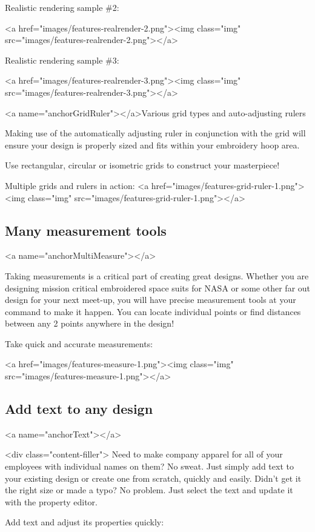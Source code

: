 \documentclass[a4paper, 11pt]{report}
\begin{document}
Realistic rendering sample \#2:

<a href="images/features-realrender-2.png"><img class="img" src="images/features-realrender-2.png"></a>

Realistic rendering sample \#3:

<a href="images/features-realrender-3.png"><img class="img" src="images/features-realrender-3.png"></a>

<a name="anchorGridRuler"></a>Various grid types and auto-adjusting rulers

Making use of the automatically adjusting ruler in conjunction with the grid will ensure your design is properly sized and fits within your embroidery hoop area.

Use rectangular, circular or isometric grids to construct your masterpiece!

Multiple grids and rulers in action:
<a href="images/features-grid-ruler-1.png"><img class="img" src="images/features-grid-ruler-1.png"></a>

\subsection{Many measurement tools}
<a name="anchorMultiMeasure"></a>

Taking measurements is a critical part of creating great designs. Whether you are designing mission critical embroidered space suits for NASA or some other far out design for your next meet-up, you will have precise measurement tools at your command to make it happen. You can locate individual points or find distances between any 2 points anywhere in the design!

Take quick and accurate measurements:

<a href="images/features-measure-1.png"><img class="img" src="images/features-measure-1.png"></a>

\subsection{Add text to any design}
<a name="anchorText"></a>

<div class="content-filler">
Need to make company apparel for all of your employees with individual names on them? No sweat. Just simply add text to your existing design or create one from scratch, quickly and easily.
Didn't get it the right size or made a typo? No problem. Just select the text and update it with the property editor.

Add text and adjust its properties quickly:
\end{document}
